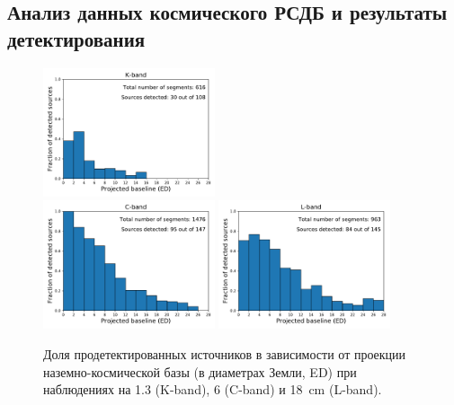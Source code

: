 \subsection{Анализ данных космического РСДБ и результаты детектирования}

\begin{figure}[tbh]
    \centering
    \includegraphics[width=0.45\textwidth,trim=0cm .5cm 0cm 0cm]{sources_hist_k_rat.pdf}\\
    \includegraphics[width=0.45\textwidth,trim=0cm .5cm 0cm 0cm]{sources_hist_c_rat.pdf}
    \includegraphics[width=0.45\textwidth,trim=0cm .5cm 0cm 0cm]{sources_hist_l_rat.pdf}

    \caption{Доля продетектированных источников в зависимости от проекции наземно-космической базы
(в диаметрах Земли, ED) при наблюдениях на 1.3 (K-band), 6 (C-band) и \SI{18}{\cm} (L-band).}
    \label{fig:RAsurvey_det}
\end{figure}

